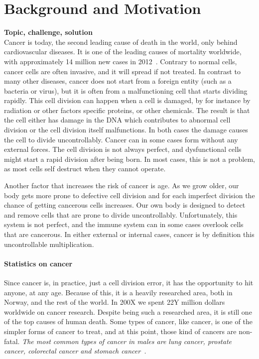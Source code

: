 \section{Background and Motivation}

\textbf{Topic, challenge, solution}\\
Cancer is today, the second leading cause of death in the world, only behind cardiovascular diseases.  %
It is one of the leading causes of mortality worldwide, with approximately 14 million new cases in 2012~\cite{WHOCANCER}.
Contrary to normal cells, cancer cells are often invasive, and it will spread if not treated. 
In contrast to many other diseases, cancer does not start from a foreign entity (such as a bacteria or virus), but it is often from a malfunctioning cell that starts dividing rapidly. 
This cell division can happen when a cell is damaged, by for instance by radiation or other factors specific proteins, or other chemicals. The result is that the cell either has damage in the DNA which contributes to abnormal cell division or the cell division itself malfunctions. In both cases the damage causes the cell to divide uncontrollably. 
Cancer can in some cases form without any external forces. The cell division is not always perfect, and dysfunctional cells might start a rapid division after being born. In most cases, this is not a problem, as most cells self destruct when they cannot operate. 

Another factor that increases the risk of cancer is age. As we grow older, our body gets more prone to defective cell division and for each imperfect division the chance of getting cancerous cells increases.  
Our own body is designed to detect and remove cells that are prone to divide uncontrollably. Unfortunately, this system is not perfect, and the immune system can in some cases overlook cells that are cancerous.
In either external or internal cases, cancer is by definition this uncontrollable multiplication.




\paragraph{Statistics on cancer}
Since cancer is, in practice, just a cell division error, it has the opportunity to hit anyone, at any age. Because of this, it is a heavily researched area, both in Norway, and the rest of the world.
In 200X we spent 22Y million dollars worldwide on cancer research. 
Despite being such a researched area, it is still one of the top causes of human death. 
Some types of cancer, like  cancer, is one of the simpler forms of cancer to treat, and at this point, those kind of cancers are non-fatal. 
\textit{The most common types of cancer in males are lung cancer, prostate cancer, colorectal cancer and stomach cancer~\cite{stewart2014world}.}
    
